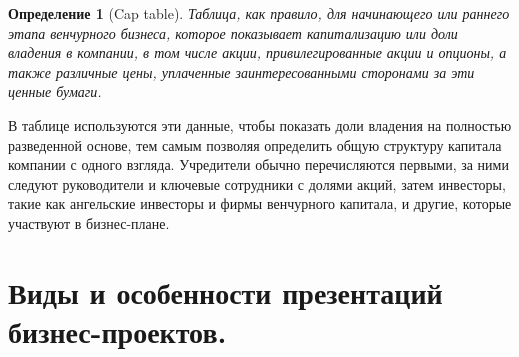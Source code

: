\documentclass[11pt]{article}
\theoremstyle{plain} %
\newtheorem{proposition}[theorem]{Определение}
\theoremstyle{definition} %
\theoremstyle{remark} %
\begin{document}
\begin{proposition}[Cap table]
	Таблица, как правило, для начинающего или раннего этапа венчурного бизнеса, которое показывает капитализацию или доли владения в компании, в том числе акции, привилегированные акции и опционы, а также различные цены, уплаченные заинтересованными сторонами за эти ценные бумаги.
\end{proposition}
В таблице используются эти данные, чтобы показать доли владения на полностью разведенной основе, тем самым позволяя определить общую структуру капитала компании с одного взгляда. Учредители обычно перечисляются первыми, за ними следуют руководители и ключевые сотрудники с долями акций, затем инвесторы, такие как ангельские инвесторы и фирмы венчурного капитала, и другие, которые участвуют в бизнес-плане.

\section{Виды и особенности презентаций бизнес-проектов.}\label{erste}
\end{document}
